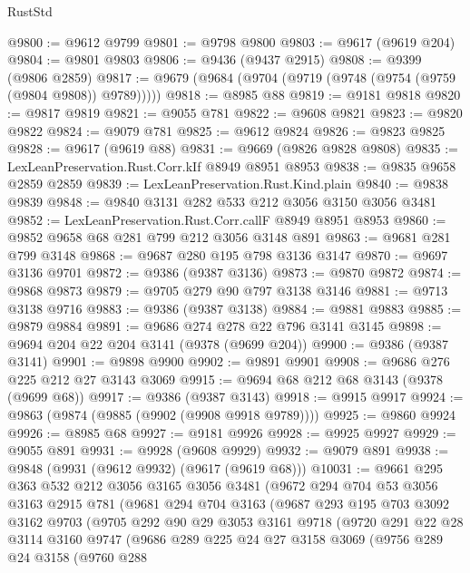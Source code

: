 \begin{lexlean}{RustStd}
\begin{coremodule}
@9800 := @9612 @9799
@9801 := @9798 @9800
@9803 := @9617 (@9619 @204)
@9804 := @9801 @9803
@9806 := @9436 (@9437 @2915)
@9808 := @9399 (@9806 @2859)
@9817 := @9679 (@9684 (@9704 (@9719 (@9748 (@9754 (@9759 (@9804 @9808)) @9789)))))
@9818 := @8985 @88
@9819 := @9181 @9818
@9820 := @9817 @9819
@9821 := @9055 @781
@9822 := @9608 @9821
@9823 := @9820 @9822
@9824 := @9079 @781
@9825 := @9612 @9824
@9826 := @9823 @9825
@9828 := @9617 (@9619 @88)
@9831 := @9669 (@9826 @9828 @9808)
@9835 := LexLeanPreservation.Rust.Corr.kIf @8949 @8951 @8953
@9838 := @9835 @9658 @2859 @2859
@9839 := LexLeanPreservation.Rust.Kind.plain
@9840 := @9838 @9839
@9848 := @9840 @3131 @282 @533 @212 @3056 @3150 @3056 @3481
@9852 := LexLeanPreservation.Rust.Corr.callF @8949 @8951 @8953
@9860 := @9852 @9658 @68 @281 @799 @212 @3056 @3148 @891
@9863 := @9681 @281 @799 @3148
@9868 := @9687 @280 @195 @798 @3136 @3147
@9870 := @9697 @3136 @9701
@9872 := @9386 (@9387 @3136)
@9873 := @9870 @9872
@9874 := @9868 @9873
@9879 := @9705 @279 @90 @797 @3138 @3146
@9881 := @9713 @3138 @9716
@9883 := @9386 (@9387 @3138)
@9884 := @9881 @9883
@9885 := @9879 @9884
@9891 := @9686 @274 @278 @22 @796 @3141 @3145
@9898 := @9694 @204 @22 @204 @3141 (@9378 (@9699 @204))
@9900 := @9386 (@9387 @3141)
@9901 := @9898 @9900
@9902 := @9891 @9901
@9908 := @9686 @276 @225 @212 @27 @3143 @3069
@9915 := @9694 @68 @212 @68 @3143 (@9378 (@9699 @68))
@9917 := @9386 (@9387 @3143)
@9918 := @9915 @9917
@9924 := @9863 (@9874 (@9885 (@9902 (@9908 @9918 @9789))))
@9925 := @9860 @9924
@9926 := @8985 @68
@9927 := @9181 @9926
@9928 := @9925 @9927
@9929 := @9055 @891
@9931 := @9928 (@9608 @9929)
@9932 := @9079 @891
@9938 := @9848 (@9931 (@9612 @9932) (@9617 (@9619 @68)))
@10031 := @9661
    @295
    @363
    @532
    @212
    @3056
    @3165
    @3056
    @3481
    (@9672
      @294
      @704
      @53
      @3056
      @3163
      @2915
      @781
      (@9681
        @294
        @704
        @3163
        (@9687
          @293
          @195
          @703
          @3092
          @3162
          @9703
          (@9705
            @292
            @90
            @29
            @3053
            @3161
            @9718
            (@9720
              @291
              @22
              @28
              @3114
              @3160
              @9747
              (@9686
                @289
                @225
                @24
                @27
                @3158
                @3069
                (@9756
                  @289
                  @24
                  @3158
                  (@9760
                    @288

\end{coremodule}
\end{lexlean}

